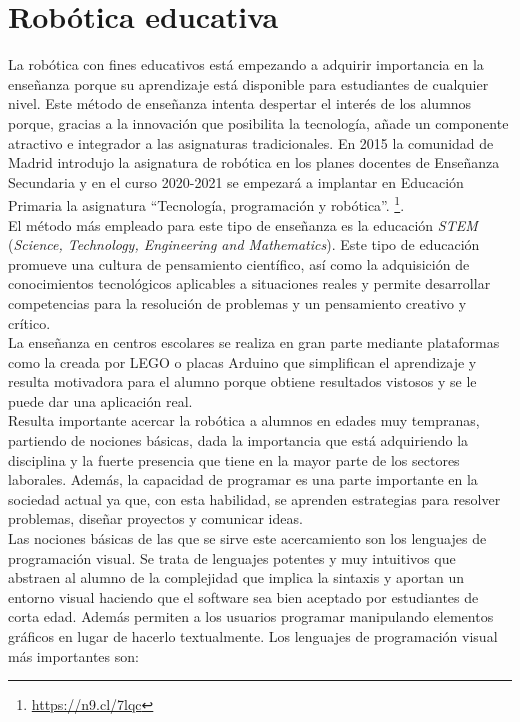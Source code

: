 \section{Robótica educativa}
\label{sec:educativa}
La robótica con fines educativos está empezando a adquirir importancia en la enseñanza porque su aprendizaje está disponible para estudiantes de cualquier nivel. Este método de enseñanza intenta despertar el interés de los alumnos porque, gracias a la innovación que posibilita la tecnología, añade un componente atractivo e integrador a las asignaturas tradicionales. En 2015 la comunidad de Madrid introdujo la asignatura de robótica en los planes docentes de Enseñanza Secundaria y en el curso 2020-2021 se empezará a implantar en Educación Primaria la asignatura ``Tecnología, programación y robótica''. \footnote{\url{https://n9.cl/7lqc}}.\\

El método más empleado para este tipo de enseñanza es la educación \textit{STEM} (\textit{Science, Technology, Engineering and Mathematics}). Este tipo de educación promueve una cultura de pensamiento científico, así como la adquisición de conocimientos tecnológicos aplicables a situaciones reales y permite desarrollar competencias para la resolución de problemas y un pensamiento creativo y crítico.   \\


La enseñanza en centros escolares se realiza en gran parte mediante plataformas como la creada por LEGO o placas Arduino que simplifican el aprendizaje y resulta motivadora para el alumno porque obtiene resultados vistosos y se le puede dar una aplicación real. \\

Resulta importante acercar la robótica a alumnos en edades muy tempranas, partiendo de nociones básicas, dada la importancia que está adquiriendo la disciplina y la fuerte presencia que tiene en la mayor parte de los sectores laborales. Además, la capacidad de programar es una parte importante en la sociedad actual ya que, con esta habilidad, se aprenden estrategias para resolver problemas, diseñar proyectos y comunicar ideas. \\


Las nociones básicas de las que se sirve este acercamiento son los lenguajes de programación visual. Se trata de lenguajes potentes y muy intuitivos que abstraen al alumno de la complejidad que implica la sintaxis y aportan un entorno visual haciendo que el software sea bien aceptado por estudiantes de corta edad. Además permiten a los usuarios programar manipulando elementos gráficos en lugar de hacerlo textualmente. Los lenguajes de programación visual más importantes son: 

